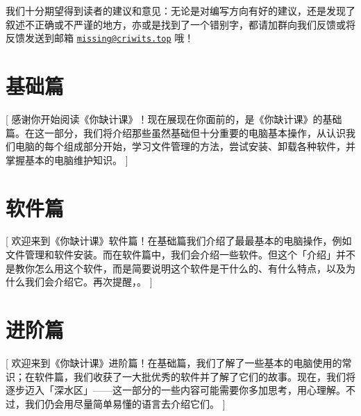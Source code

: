 \documentclass[a4paper]{book}
\begin{document}
\vspace*{.6cm}
\begin{note}
  我们十分期望得到读者的建议和意见：无论是对编写方向有好的建议，还是发现了叙述不正确或不严谨的地方，亦或是找到了一个错别字，都请加群向我们反馈或将反馈发送到邮箱 \href{mailto:missing@criwits.top}{\texttt{missing@criwits.top}} 哦！
\end{note}



\tableofcontents

\mainmatter

\part{基础篇}[
  感谢你开始阅读《你缺计课》！现在展现在你面前的，是《你缺计课》的基础篇。在这一部分，我们将介绍那些虽然基础但十分重要的电脑基本操作，从认识我们电脑的每个组成部分开始，学习文件管理的方法，尝试安装、卸载各种软件，并掌握基本的电脑维护知识。
]









\part{软件篇}[
  欢迎来到《你缺计课》软件篇！在基础篇我们介绍了最最基本的电脑操作，例如文件管理和软件安装。而在软件篇中，我们会介绍一些软件。但这个「介绍」并不是教你怎么用这个软件，而是简要说明这个软件是干什么的、有什么特点，以及为什么我们会介绍它。再次提醒，\hspace{-.7em}。
]








\part{进阶篇}[
  欢迎来到《你缺计课》进阶篇！在基础篇，我们了解了一些基本的电脑使用的常识；在软件篇，我们收获了一大批优秀的软件并了解了它们的故事。现在，我们将逐步迈入「深水区」——这一部分的一些内容可能需要你多加思考，用心理解。不过，我们仍会用尽量简单易懂的语言去介绍它们。
]
\end{document}
